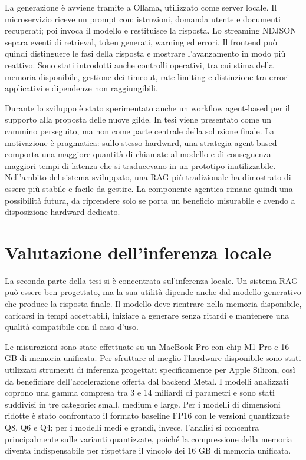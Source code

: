 \documentclass[12pt,a4paper]{article}
\begin{document}
La generazione è avviene tramite a Ollama, utilizzato come server locale. Il microservizio
riceve un prompt con: istruzioni, domanda utente e documenti recuperati; poi
invoca il modello e restituisce la risposta. Lo streaming NDJSON separa eventi
di retrieval, token generati, warning ed errori. Il frontend può quindi
distinguere le fasi della risposta e mostrare l'avanzamento in modo più
reattivo. Sono stati introdotti anche controlli operativi, tra cui stima della
memoria disponibile, gestione dei timeout, rate limiting e distinzione tra
errori applicativi e dipendenze non raggiungibili.

Durante lo sviluppo è stato sperimentato anche un workflow
agent-based per il supporto alla proposta delle nuove gilde. In tesi viene presentato 
come un cammino perseguito, ma non come parte centrale della soluzione finale. La motivazione 
è pragmatica: sullo stesso hardward, una strategia agent-based comporta una maggiore 
quantità di chiamate al modello e di conseguenza maggiori tempi di latenza che si 
traducevano in un prototipo inutilizzabile. Nell'ambito del sistema sviluppato, 
una RAG più tradizionale ha dimostrato di essere più stabile e facile da gestire.
La componente agentica rimane quindi una possibilità futura, da riprendere solo 
se porta un beneficio misurabile e avendo a disposizione hardward dedicato.

\section*{Valutazione dell'inferenza locale}

La seconda parte della tesi si è concentrata sul'inferenza locale. Un sistema RAG può
essere ben progettato, ma la sua utilità dipende anche dal modello generativo
che produce la risposta finale. Il modello deve rientrare nella memoria
disponibile, caricarsi in tempi accettabili, iniziare a generare senza ritardi
e mantenere una qualità compatibile con il caso d'uso.

Le misurazioni sono state effettuate su un MacBook Pro con chip M1 Pro e 16 GB 
di memoria unificata. Per sfruttare al meglio l'hardware disponibile sono stati 
utilizzati strumenti di inferenza progettati specificamente per Apple Silicon, così 
da beneficiare dell'accelerazione offerta dal backend Metal. I modelli analizzati 
coprono una gamma compresa tra 3 e 14 miliardi di parametri e sono stati suddivisi 
in tre categorie: small, medium e large. Per i modelli di dimensioni ridotte è stato 
confrontato il formato baseline FP16 con le versioni quantizzate Q8, Q6 e Q4; per i 
modelli medi e grandi, invece, l'analisi si concentra principalmente sulle varianti 
quantizzate, poiché la compressione della memoria diventa indispensabile per rispettare 
il vincolo dei 16 GB di memoria unificata.
\end{document}
